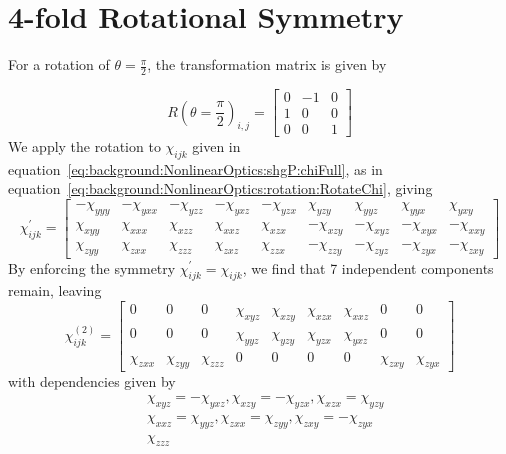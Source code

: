 \section{4-fold Rotational Symmetry}\label{sec:appendix:rotations:4foldRot}

For a rotation of $\theta=\frac{\pi}{2}$, the transformation matrix is given by

\begin{equation}\label{eq:pi/2RotationMatrix}
	R(\theta=\frac{\pi}{2})_{i,j} =
	\begin{bmatrix}
		0 & -1 & 0\\ 
		1 & 0 & 0\\ 
		0 & 0 & 1
	\end{bmatrix}
\end{equation}
We apply the rotation to $\chi_{ijk}$ given in equation~\ref{eq:background:NonlinearOptics:shgP:chiFull}, as in equation~\ref{eq:background:NonlinearOptics:rotation:RotateChi}, giving
\begin{equation}\label{eq:ChiFull4fold}
	\chi_{ijk}^{\prime} =
	\begin{bmatrix}
		-\chi_{yyy} & -\chi_{yxx} & -\chi_{yzz} & -\chi_{yxz} & -\chi_{yzx} & \chi_{yzy} & \chi_{yyz} & \chi_{yyx} & \chi_{yxy}\\ 
		\chi_{xyy} & \chi_{xxx} & \chi_{xzz} & \chi_{xxz} & \chi_{xzx} & -\chi_{xzy} & -\chi_{xyz} & -\chi_{xyx} & -\chi_{xxy}\\ 
		\chi_{zyy} & \chi_{zxx} & \chi_{zzz} & \chi_{zxz} & \chi_{zzx} & -\chi_{zzy} & -\chi_{zyz} & -\chi_{zyx} & -\chi_{zxy}
	\end{bmatrix}
\end{equation}
By enforcing the symmetry $\chi_{ijk}^{\prime}=\chi_{ijk}$, we find that 7 independent components remain, leaving
\begin{equation}\label{eq:4foldChi}
	\chi^{(2)}_{ijk} =
	\begin{bmatrix}
		0 & 0 & 0 & \chi_{xyz} & \chi_{xzy} & \chi_{xzx} & \chi_{xxz} & 0 & 0\\ 
		0 & 0 & 0 & \chi_{yyz} & \chi_{yzy} & \chi_{yzx} & \chi_{yxz} & 0 & 0\\ 
		\chi_{zxx} & \chi_{zyy} & \chi_{zzz} & 0 & 0 & 0 & 0 & \chi_{zxy} & \chi_{zyx}
	\end{bmatrix}
\end{equation}
with dependencies given by
\begin{equation}\label{eq:4foldDependancies}
\begin{split}
	&\chi_{xyz} = -\chi_{yxz}, \chi_{xzy} = -\chi_{yzx}, \chi_{xzx} = \chi_{yzy} \\
	&\chi_{xxz} = \chi_{yyz}, \chi_{zxx} = \chi_{zyy}, \chi_{zxy} = -\chi_{zyx} \\
	&\chi_{zzz}
\end{split}
\end{equation}
